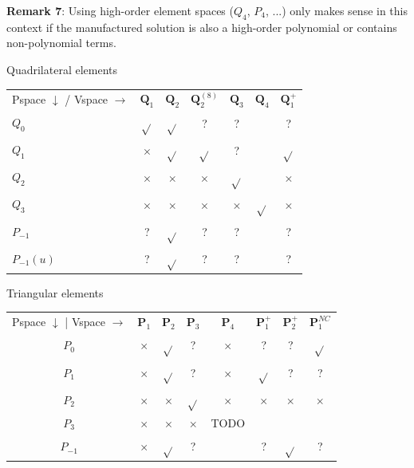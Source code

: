 {\bf Remark 7}: Using high-order element spaces ($Q_4$, $P_4$, ...) only makes sense in this context
if the manufactured solution is also a high-order polynomial or contains non-polynomial terms.

\vspace{0.5cm}

\begin{center}
Quadrilateral elements\\
\begin{tabular}{lcccccc}
\hline
Pspace $\downarrow$ / Vspace $\rightarrow$   
  & ${\bm Q}_1$  & ${\bm Q}_2$     & ${\bm Q}_2^{(8)}$ & ${\bm Q}_3$  & ${\bm Q}_4$ & ${\bm Q}_1^+$       \\ 
$Q_0$       & $\sqrt{}$ & $\sqrt{}$ & ?           & ?         &   & ?          \\
$Q_1$       & $\times$  & $\sqrt{}$ & $\sqrt{}$   & ?         &   & $\sqrt{}$  \\
$Q_2$       & $\times$  & $\times$  & $\times$    & $\sqrt{}$ &   & $\times$   \\
$Q_3$       & $\times$  & $\times$  & $\times$    & $\times$  & $\sqrt{}$ & $\times$ \\
$P_{-1}$    & ?         & $\sqrt{}$ & ?           & ?         &   & ?          \\
$P_{-1}(u)$ & ?         & $\sqrt{}$ & ?           & ?         &   & ?          \\
\hline
\end{tabular}
\end{center}

\begin{center}
Triangular elements\\
\begin{tabular}{cccccccc}
\hline
Pspace $\downarrow$ | Vspace $\rightarrow$   
         & ${\bm P}_1$    & ${\bm P}_2$     & ${\bm P}_3$     & ${\bm P}_4$    & ${\bm P}_1^+$   & ${\bm P}_2^+$   & ${\bm P}_1^{NC}$  \\
$P_0$    & $\times$ & $\sqrt{}$ & ?         & $\times$ &  ?        &  ?        & $\sqrt{}$   \\
$P_1$    & $\times$ & $\sqrt{}$ & ?         & $\times$ & $\sqrt{}$ &  ?        & ?           \\
$P_2$    & $\times$ & $\times$  & $\sqrt{}$ & $\times$ & $\times$  & $\times$  & $\times$    \\
$P_3$    & $\times$ & $\times$  & $\times$  & TODO     &           &           &             \\ 
$P_{-1}$ & $\times$ & $\sqrt{}$ & ?         &          &  ?        & $\sqrt{}$ & ?           \\
\hline
\end{tabular}
\end{center}


